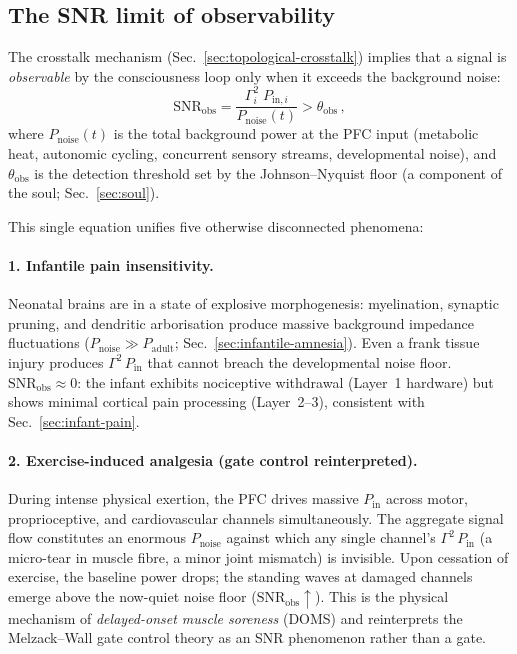 \documentclass[aps,pre,twocolumn,superscriptaddress,floatfix]{revtex4-2}
\begin{document}
\subsection{The SNR limit of observability}
\label{sec:snr-observability}

The crosstalk mechanism (Sec.~\ref{sec:topological-crosstalk})
implies that a signal is \emph{observable} by the
consciousness loop only when it exceeds the
background noise:
\begin{equation}
  \mathrm{SNR}_{\text{obs}}
  = \frac{\Gamma_i^2\;P_{\text{in},i}}
         {P_{\text{noise}}(t)}
  > \theta_{\text{obs}}\,,
  \label{eq:snr-obs}
\end{equation}
where
$P_{\text{noise}}(t)$ is the total background power at
the PFC input (metabolic heat, autonomic cycling,
concurrent sensory streams, developmental noise),
and $\theta_{\text{obs}}$ is the detection threshold set
by the Johnson--Nyquist floor (a component of the
soul; Sec.~\ref{sec:soul}).

This single equation unifies five otherwise
disconnected phenomena:

\paragraph{1. Infantile pain insensitivity.}
Neonatal brains are in a state of explosive
morphogenesis: myelination, synaptic pruning, and
dendritic arborisation produce massive background
impedance fluctuations
($P_{\text{noise}} \gg P_{\text{adult}}$;
Sec.~\ref{sec:infantile-amnesia}).
Even a frank tissue injury produces
$\Gamma^2\,P_{\text{in}}$ that cannot breach the
developmental noise floor.
$\mathrm{SNR}_{\text{obs}} \approx 0$:
the infant exhibits nociceptive withdrawal (Layer~1
hardware) but shows minimal cortical pain processing
(Layer~2--3), consistent with
Sec.~\ref{sec:infant-pain}.

\paragraph{2. Exercise-induced analgesia
  (gate control reinterpreted).}
During intense physical exertion, the PFC drives
massive $P_{\text{in}}$ across motor, proprioceptive,
and cardiovascular channels simultaneously.
The aggregate signal flow constitutes an enormous
$P_{\text{noise}}$ against which any single channel's
$\Gamma^2\,P_{\text{in}}$ (a micro-tear in muscle
fibre, a minor joint mismatch) is invisible.
Upon cessation of exercise, the baseline power drops;
the standing waves at damaged channels emerge
above the now-quiet noise floor
($\mathrm{SNR}_{\text{obs}} \uparrow$).
This is the physical mechanism of
\emph{delayed-onset muscle soreness} (DOMS)
and reinterprets the Melzack--Wall gate control theory
as an SNR phenomenon rather than a gate.
\end{document}
